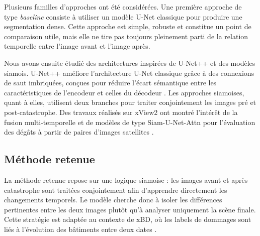 \documentclass[french,12pt]{article}
\begin{document}
Plusieurs familles d'approches ont été considérées. Une première approche de type \textit{baseline} consiste à utiliser un modèle U-Net classique pour produire une segmentation dense. Cette approche est simple, robuste et constitue un point de comparaison utile, mais elle ne tire pas toujours pleinement parti de la relation temporelle entre l'image avant et l'image après.

Nous avons ensuite étudié des architectures inspirées de U-Net++ et des modèles siamois. U-Net++ améliore l'architecture U-Net classique grâce à des connexions de saut imbriquées, conçues pour réduire l'écart sémantique entre les caractéristiques de l'encodeur et celles du décodeur \cite{unetplusplus}. Les approches siamoises, quant à elles, utilisent deux branches pour traiter conjointement les images pré et post-catastrophe. Des travaux réalisés sur xView2 ont montré l'intérêt de la fusion multi-temporelle et de modèles de type Siam-U-Net-Attn pour l'évaluation des dégâts à partir de paires d'images satellites \cite{xview2_multitemporal,siamunet_attn}.

\subsection{Méthode retenue}

La méthode retenue repose sur une logique siamoise : les images avant et après catastrophe sont traitées conjointement afin d'apprendre directement les changements temporels. Le modèle cherche donc à isoler les différences pertinentes entre les deux images plutôt qu'à analyser uniquement la scène finale. Cette stratégie est adaptée au contexte de xBD, où les labels de dommages sont liés à l'évolution des bâtiments entre deux dates \cite{xbd,xview2_multitemporal}.
\end{document}
